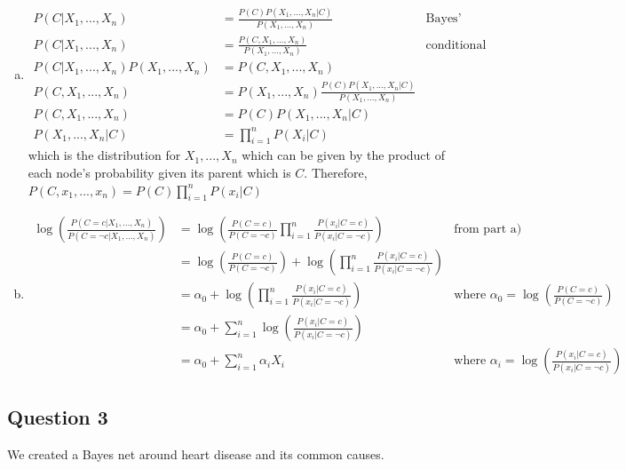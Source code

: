 \documentclass{article}
\begin{document}
\begin{enumerate}[a)]
\item
\begin{align*}
P(C | X_1, \ldots , X_n) &= \frac{P(C) P(X_1, \ldots , X_n | C)}{P(X_1, \ldots , X_n)} & \text{Bayes' Theorem} \\
P(C | X_1, ... , X_n) &= \frac{P(C, X_1, ... , X_n)}{P(X_1, ... , X_n)} & \text{conditional probability} \\
P(C | X_1, ... , X_n) P(X_1, ... , X_n) &= P(C, X_1, ... , X_n) \\
P(C, X_1, ... , X_n) &=  P(X_1, ... , X_n) \frac{P(C) P(X_1, ... , X_n | C)}{P(X_1, ... , X_n)} \\
P(C, X_1, ... , X_n) &=  P(C) P(X_1, ... , X_n | C) \\ 
P(X_1, ... , X_n | C) &=  \prod_{i=1}^n P(X_i | C) 
\end{align*}
which is the distribution for $X_1, ..., X_n$ which can be given by the product of each node's probability given its parent which is $C$.
Therefore,
$P(C, x_1, ... , x_n) =  P(C) \prod_{i=1}^n P(x_i | C) $
\item
\begin{align*}
\log{\left(\frac{P(C = c | X_1, \ldots, X_n)}{P(C = \neg c | X_1, \ldots, X_n)}\right)} &= \log{\left(\frac{P(C=c)}{P(C=\neg c)} \prod_{i=1}^n \frac{P(x_i | C = c)}{P(x_i | C = \neg c)}\right)} & \text{from part a)} \\
&= \log{\left(\frac{P(C=c)}{P(C=\neg c)}\right)} + \log{\left(\prod_{i=1}^n \frac{P(x_i | C = c)}{P(x_i | C = \neg c)}\right)} \\
&= \alpha_0 + \log{\left(\prod_{i=1}^n \frac{P(x_i | C = c)}{P(x_i | C = \neg c)}\right)} & \text{where } \alpha_0 = \log{\left(\frac{P(C=c)}{P(C=\neg c)}\right)} \\
&= \alpha_0 + \sum_{i=1}^n \log{\left(\frac{P(x_i | C = c)}{P(x_i | C = \neg c)}\right)} \\
&= \alpha_0 + \sum_{i=1}^n \alpha_i X_i & \text{where } \alpha_i = \log{\left(\frac{P(x_i | C = c)}{P(x_i | C = \neg c)}\right)}
\end{align*}
\end{enumerate}

\subsection{Question 3}
We created a Bayes net around heart disease and its common causes.
\end{document}
